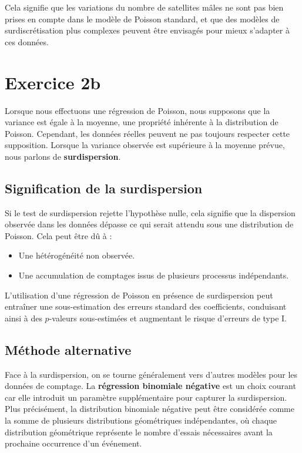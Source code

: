 \documentclass[../main.tex]{subfiles}
\begin{document}
\begin{CJK*}{UTF8}{gbsn}
Cela signifie que les variations du nombre de satellites mâles ne sont pas bien prises en compte dans le modèle de Poisson standard, et que des modèles de surdiscrétisation plus complexes peuvent être envisagés pour mieux s'adapter à ces données.

\section*{Exercice 2b}

Lorsque nous effectuons une régression de Poisson, nous supposons que la variance est égale à la moyenne, une propriété inhérente à la distribution de Poisson. Cependant, les données réelles peuvent ne pas toujours respecter cette supposition. Lorsque la variance observée est supérieure à la moyenne prévue, nous parlons de \textbf{surdispersion}.

\subsection*{Signification de la surdispersion}

Si le test de surdispersion rejette l'hypothèse nulle, cela signifie que la dispersion observée dans les données dépasse ce qui serait attendu sous une distribution de Poisson. Cela peut être dû à :
\begin{itemize}
    \item Une hétérogénéité non observée.
    \item Une accumulation de comptages issus de plusieurs processus indépendants.
\end{itemize}

L'utilisation d'une régression de Poisson en présence de surdispersion peut entraîner une sous-estimation des erreurs standard des coefficients, conduisant ainsi à des $p$-valeurs sous-estimées et augmentant le risque d'erreurs de type I.

\subsection*{Méthode alternative}

Face à la surdispersion, on se tourne généralement vers d'autres modèles pour les données de comptage. La \textbf{régression binomiale négative} est un choix courant car elle introduit un paramètre supplémentaire pour capturer la surdispersion. Plus précisément, la distribution binomiale négative peut être considérée comme la somme de plusieurs distributions géométriques indépendantes, où chaque distribution géométrique représente le nombre d'essais nécessaires avant la prochaine occurrence d'un événement.


\end{CJK*}
\end{document}
